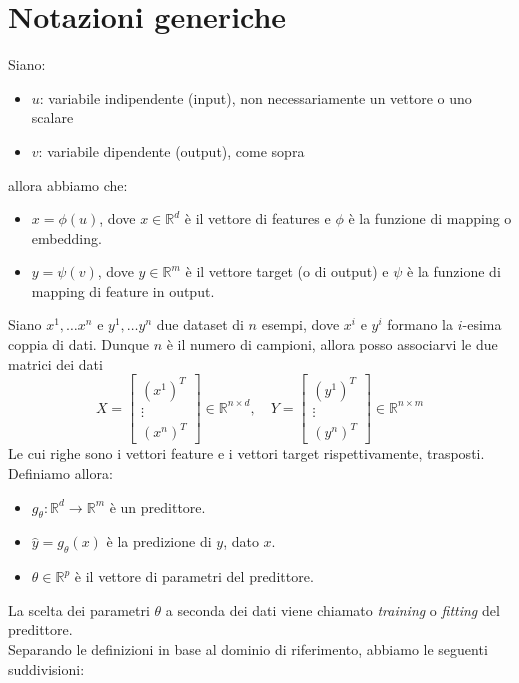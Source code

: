 \section{Notazioni generiche}
Siano:
\begin{itemize}
	\item $u$: variabile indipendente (input), non necessariamente un vettore o uno scalare
	\item $v$: variabile dipendente (output), come sopra 
\end{itemize}
allora abbiamo che:
\begin{itemize}
	\item $x=\phi(u)$, dove $x\in \mathbb{R}^d$ è il vettore di features e $\phi$ è la funzione di mapping o embedding.
	\item $y=\psi(v)$, dove $y\in \mathbb{R}^m$ è il vettore target (o di output) e $\psi$ è la funzione di mapping di feature in output.
\end{itemize}
Siano $x^1,\dots x^n$ e $y^1,\dots y^n$ due dataset di $n$ esempi, dove $x^i$ e $y^i$ formano la $i$-esima coppia di dati. Dunque $n$ è il numero di campioni, allora posso associarvi le due matrici dei dati
$$X=\begin{bmatrix}
	(x^1)^T\\ \vdots \\ (x^n)^T
\end{bmatrix}\in \mathbb{R}^{n \times d}, \quad Y=\begin{bmatrix}
	(y^1)^T\\ \vdots \\ (y^n)^T
\end{bmatrix}\in \mathbb{R}^{n \times m}$$
Le cui righe sono i vettori feature e i vettori target rispettivamente, trasposti.\\
Definiamo allora:
\begin{itemize}
	\item $g_\theta: \mathbb{R}^d \to \mathbb{R}^m$ è un predittore. 
	\item $\hat{y}=g_\theta(x)$ è la predizione di $y$, dato $x$.
	\item $\theta\in\mathbb{R}^p$ è il vettore di parametri del predittore.
\end{itemize}
La scelta dei parametri $\theta$ a seconda dei dati viene chiamato \textit{training} o \textit{fitting} del predittore. 
\\
Separando le definizioni in base al dominio di riferimento, abbiamo le seguenti suddivisioni:
